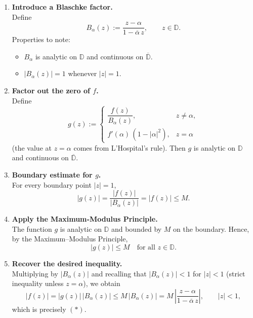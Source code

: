 \documentclass[12pt]{article}
\theoremstyle{definition} %
\theoremstyle{plain} %
\begin{document}
\begin{enumerate}
\item \textbf{Introduce a Blaschke factor.}\\
      Define
      \[
        B_\alpha(z):=\frac{z-\alpha}{1-\overline{\alpha}\,z},
        \qquad z\in\mathbb D.
      \]
      Properties to note:
      \begin{itemize}
        \item $B_\alpha$ is analytic on $\mathbb D$ and continuous on $\overline{\mathbb D}$.
        \item $|B_\alpha(z)|=1$ whenever $|z|=1$.
      \end{itemize}

\item \textbf{Factor out the zero of $f$.}\\
      Define
      \[
          g(z):=
          \begin{cases}
             \dfrac{f(z)}{B_\alpha(z)}, & z\neq\alpha,\\[6pt]
             f'(\alpha)\,(1-|\alpha|^{2}), & z=\alpha
          \end{cases}
      \]
      (the value at $z=\alpha$ comes from L’Hospital’s rule).
      Then $g$ is analytic on $\mathbb D$ and continuous on $\overline{\mathbb D}$.

\item \textbf{Boundary estimate for $g$.}\\
      For every boundary point $|z|=1$,
      \[
         |g(z)|=\frac{|f(z)|}{|B_\alpha(z)|}
                =|f(z)|\le M .
      \]

\item \textbf{Apply the Maximum‐Modulus Principle.}\\
      The function $g$ is analytic on $\mathbb D$ and bounded by $M$
      on the boundary.  Hence, by the Maximum–Modulus Principle,
      \[
         |g(z)|\le M\quad\text{for all }z\in\mathbb D.
      \]

\item \textbf{Recover the desired inequality.}\\
      Multiplying by $|B_\alpha(z)|$ and recalling that $|B_\alpha(z)|<1$
      for $|z|<1$ (strict inequality unless $z=\alpha$), we obtain
      \[
         |f(z)| = |g(z)|\,|B_\alpha(z)|
                 \le M\,|B_\alpha(z)|
                 = M\,
                   \left|\frac{z-\alpha}{1-\overline{\alpha}\,z}\right|,
                 \qquad |z|<1,
      \]
      which is precisely $(\ast)$.
\end{enumerate}
\end{document}

